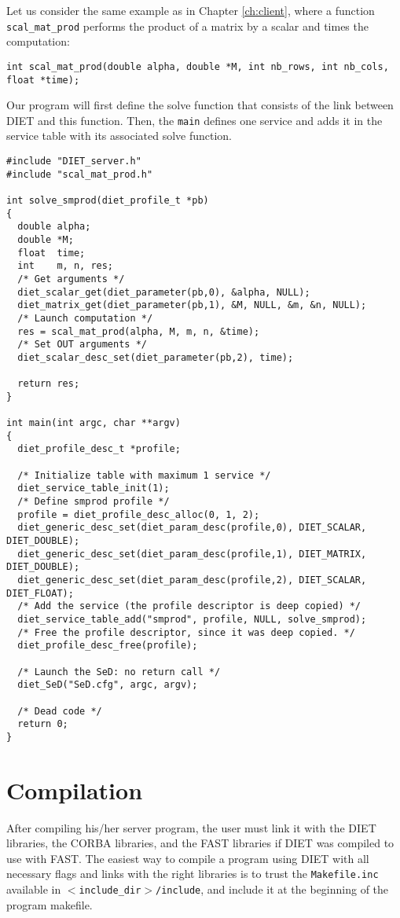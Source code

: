 {{Let us consider the same example as in Chapter \ref{ch:client}, where a function
\texttt{scal\_mat\_prod} performs the product of a matrix by a scalar
and times the computation:
{\footnotesize
\begin{verbatim}
int scal_mat_prod(double alpha, double *M, int nb_rows, int nb_cols, float *time);
\end{verbatim}
}
Our program will first define the solve function that consists of the link
between DIET and this function. Then, the \texttt{main} defines one service and
adds it in the service table with its associated solve function.
{\footnotesize
\begin{verbatim}
#include "DIET_server.h"
#include "scal_mat_prod.h"

int solve_smprod(diet_profile_t *pb)
{
  double alpha;
  double *M;
  float  time;
  int    m, n, res;
  /* Get arguments */
  diet_scalar_get(diet_parameter(pb,0), &alpha, NULL);
  diet_matrix_get(diet_parameter(pb,1), &M, NULL, &m, &n, NULL);
  /* Launch computation */
  res = scal_mat_prod(alpha, M, m, n, &time);
  /* Set OUT arguments */
  diet_scalar_desc_set(diet_parameter(pb,2), time);

  return res;
}

int main(int argc, char **argv)
{
  diet_profile_desc_t *profile;
  
  /* Initialize table with maximum 1 service */
  diet_service_table_init(1);
  /* Define smprod profile */
  profile = diet_profile_desc_alloc(0, 1, 2);
  diet_generic_desc_set(diet_param_desc(profile,0), DIET_SCALAR, DIET_DOUBLE);
  diet_generic_desc_set(diet_param_desc(profile,1), DIET_MATRIX, DIET_DOUBLE);
  diet_generic_desc_set(diet_param_desc(profile,2), DIET_SCALAR, DIET_FLOAT);
  /* Add the service (the profile descriptor is deep copied) */
  diet_service_table_add("smprod", profile, NULL, solve_smprod);
  /* Free the profile descriptor, since it was deep copied. */
  diet_profile_desc_free(profile);

  /* Launch the SeD: no return call */
  diet_SeD("SeD.cfg", argc, argv);

  /* Dead code */
  return 0;
}
\end{verbatim}
}


\section{Compilation}
\label{sec:sv_comp}


After compiling his/her server program, the user must link it with the DIET
libraries, the CORBA libraries, and the FAST libraries if DIET was compiled to
use with FAST. The easiest way to compile a program using DIET with all
necessary flags and links with the right libraries is to trust the
\texttt{Makefile.inc} available in \texttt{$<$include\_dir$>$/include}, and
include it at the beginning of the program makefile.

}}
